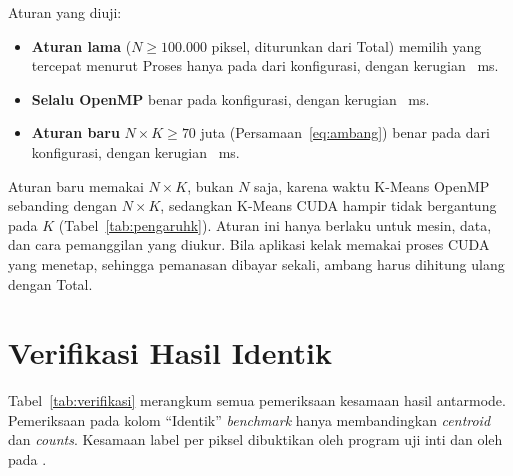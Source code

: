 

Aturan yang diuji:
\begin{itemize}
    \item \textbf{Aturan lama} ($N\geq100.000$ piksel, diturunkan dari Total) memilih yang tercepat menurut Proses hanya pada \AmbLamaBenarProses{} dari \AmbJumlah{} konfigurasi, dengan kerugian \AmbLamaRugi~ms.
    \item \textbf{Selalu OpenMP} benar pada \AmbOmpBenarProses{} konfigurasi, dengan kerugian \AmbOmpRugi~ms.
    \item \textbf{Aturan baru} $N\times K\geq70$ juta (Persamaan~\ref{eq:ambang}) benar pada \AmbBaruBenarProses{} dari \AmbJumlah{} konfigurasi, dengan kerugian \AmbBaruRugi~ms.
\end{itemize}
Aturan baru memakai $N\times K$, bukan $N$ saja, karena waktu K-Means OpenMP sebanding dengan $N\times K$, sedangkan K-Means CUDA hampir tidak bergantung pada $K$ (Tabel~\ref{tab:pengaruhk}). Aturan ini hanya berlaku untuk mesin, data, dan cara pemanggilan yang diukur. Bila aplikasi kelak memakai proses CUDA yang menetap, sehingga pemanasan dibayar sekali, ambang harus dihitung ulang dengan Total.

\section{Verifikasi Hasil Identik}
\label{sec:hasilverifikasi}
Tabel~\ref{tab:verifikasi} merangkum semua pemeriksaan kesamaan hasil antarmode. Pemeriksaan pada kolom ``Identik'' \emph{benchmark} hanya membandingkan \emph{centroid} dan \emph{counts}. Kesamaan label per piksel dibuktikan oleh program uji inti dan oleh  pada .

